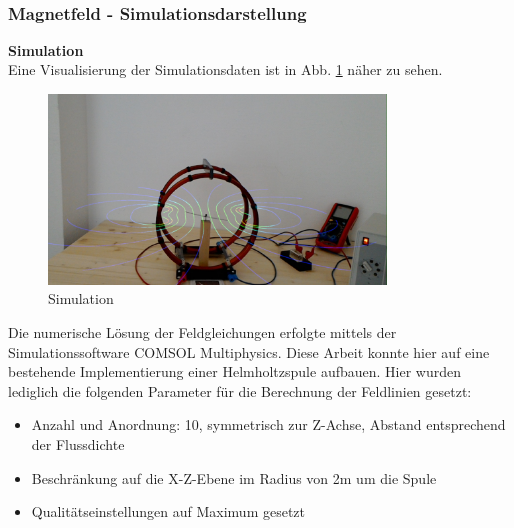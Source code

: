 \vspace{4px}
\begin{center}
	\\
\end{center}
\vspace{6px}

\subsubsection{Magnetfeld - Simulationsdarstellung}
\textbf{Simulation}\\
Eine Visualisierung der Simulationsdaten ist in Abb. \ref{img:mfield-simulation} näher zu sehen.
\begin{figure}[H]
	\centering
	\includegraphics[width=0.8\textwidth]{images/HL/simulation.jpg}
	\caption{Simulation}
	\label{img:mfield-simulation}
\end{figure}


Die numerische Lösung der Feldgleichungen erfolgte mittels der Simulationssoftware COMSOL Multiphysics. Diese Arbeit konnte hier auf eine bestehende Implementierung einer Helmholtzspule aufbauen. Hier wurden lediglich die folgenden Parameter für die Berechnung der Feldlinien gesetzt:
\begin{itemize}
	\setlength{\itemsep}{-1pt}
	\singlespacing
	\item Anzahl und Anordnung: 10, symmetrisch zur Z-Achse, Abstand entsprechend der Flussdichte
	\item Beschränkung auf die X-Z-Ebene im Radius von 2m um die Spule
	\item Qualitätseinstellungen auf Maximum gesetzt
\end{itemize}

